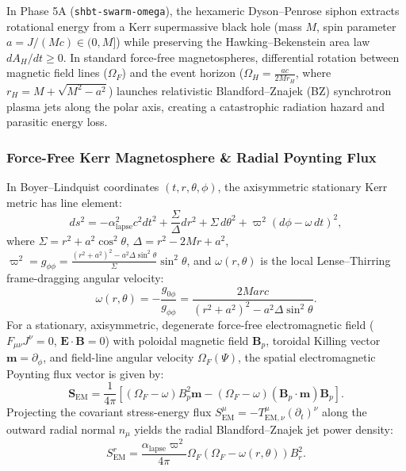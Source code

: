\documentclass[11pt,onecolumn]{article}
\begin{document}
In Phase 5A (\texttt{shbt-swarm-omega}), the hexameric Dyson--Penrose siphon extracts rotational energy from a Kerr supermassive black hole (mass $M$, spin parameter $a = J/(Mc) \in (0, M]$) while preserving the Hawking--Bekenstein area law $dA_H / dt \ge 0$. In standard force-free magnetospheres, differential rotation between magnetic field lines ($\Omega_F$) and the event horizon ($\Omega_H = \frac{a c}{2 M r_H}$, where $r_H = M + \sqrt{M^2 - a^2}$) launches relativistic Blandford--Znajek (BZ) synchrotron plasma jets along the polar axis, creating a catastrophic radiation hazard and parasitic energy loss.

\subsubsection{Force-Free Kerr Magnetosphere \& Radial Poynting Flux}
In Boyer--Lindquist coordinates $(t, r, \theta, \phi)$, the axisymmetric stationary Kerr metric has line element:
\begin{equation}
ds^2 = -\alpha_{\mathrm{lapse}}^2 c^2 dt^2 + \frac{\Sigma}{\Delta}dr^2 + \Sigma\,d\theta^2 + \varpi^2\left(d\phi - \omega\,dt\right)^2,
\end{equation}
where $\Sigma = r^2 + a^2 \cos^2\theta$, $\Delta = r^2 - 2Mr + a^2$, $\varpi^2 = g_{\phi\phi} = \frac{(r^2 + a^2)^2 - a^2\Delta\sin^2\theta}{\Sigma}\sin^2\theta$, and $\omega(r, \theta)$ is the local Lense--Thirring frame-dragging angular velocity:
\begin{equation}
\omega(r, \theta) = -\frac{g_{0\phi}}{g_{\phi\phi}} = \frac{2 M a r c}{(r^2 + a^2)^2 - a^2\Delta\sin^2\theta}.
\end{equation}
For a stationary, axisymmetric, degenerate force-free electromagnetic field ($F_{\mu\nu}J^\nu = 0$, $\mathbf{E}\cdot\mathbf{B} = 0$) with poloidal magnetic field $\mathbf{B}_p$, toroidal Killing vector $\mathbf{m} = \partial_\phi$, and field-line angular velocity $\Omega_F(\Psi)$, the spatial electromagnetic Poynting flux vector is given by:
\begin{equation}
\mathbf{S}_{\mathrm{EM}} = \frac{1}{4\pi}\left[ (\Omega_F - \omega)B_p^2\mathbf{m} - (\Omega_F - \omega)(\mathbf{B}_p \cdot \mathbf{m})\mathbf{B}_p \right].
\label{eq:poynting_kerr}
\end{equation}
Projecting the covariant stress-energy flux $S_{\mathrm{EM}}^\mu = -T_{\mathrm{EM},\nu}^\mu (\partial_t)^\nu$ along the outward radial normal $n_\mu$ yields the radial Blandford--Znajek jet power density:
\begin{equation}
S_{\mathrm{EM}}^r = \frac{\alpha_{\mathrm{lapse}}\varpi^2}{4\pi}\Omega_F\left(\Omega_F - \omega(r, \theta)\right)B_r^2.
\end{equation}
\end{document}
